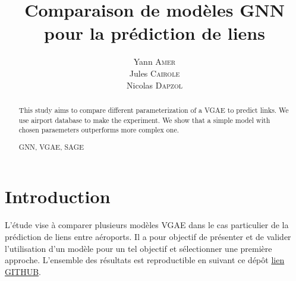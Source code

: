 \documentclass[french]{llncs}
\title{ Comparaison de modèles GNN pour la prédiction de liens }
\author{ Yann  \textsc{Amer} \\
         Jules \textsc{Cairole} \\
         Nicolas \textsc{Dapzol} 
          }
\institute{Université Claude Bernard Lyon 1, France}
\begin{document}
    \renewcommand{\thelstlisting}{\arabic{lstlisting}}

    \maketitle   
    
    \begin{abstract}
        This study aims to compare different parameterization of a VGAE to predict links.
        We use airport database to make the experiment. We show that a simple model with chosen paraemeters outperforms more complex one.
        
         \begin{keywords}
        GNN, VGAE, SAGE
    \end{keywords}
    \end{abstract}


   


    \section{Introduction  } \label{intro}

L'étude vise à comparer plusieurs modèles VGAE dans le cas particulier de la prédiction de liens entre aéroports.  Il a pour objectif de présenter et de valider l'utilisation d'un modèle pour un tel objectif et sélectionner une première approche.  L'ensemble des résultats est reproductible en suivant ce dépôt \href{https://github.com/nicolasdapzol/projetGNN_airport.git}{ lien GITHUB}.
        
        
      
      
\end{document}
